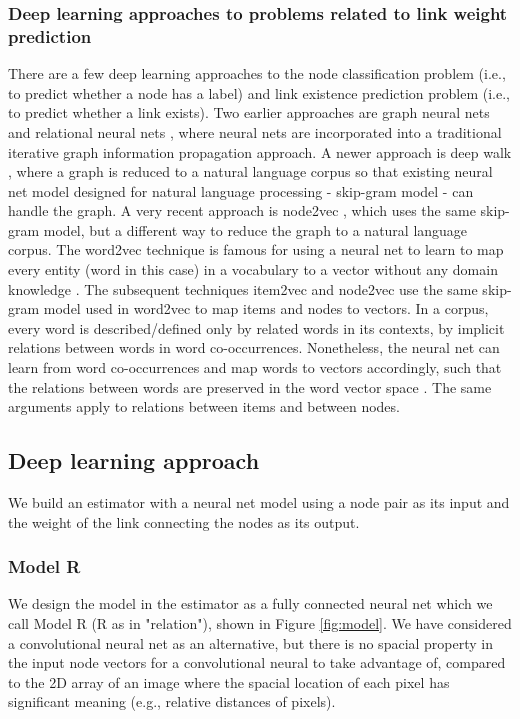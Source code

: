 \documentclass{article}
\begin{document}
\subsubsection{Deep learning approaches to problems related to link weight prediction}
There are a few deep learning approaches to
the node classification problem (i.e., to predict whether a node has a label) and 
link existence prediction problem (i.e., to predict whether a link exists).
Two earlier approaches are graph neural nets and relational neural 
nets \cite{scarselli2009graph},
where neural nets are incorporated into a traditional iterative graph 
information propagation approach.
A newer approach is deep walk \cite{perozzi2014deepwalk}, 
where a graph is reduced to a natural language corpus so that existing neural 
net model designed for natural language processing - skip-gram model - can handle the graph.
A very recent approach is node2vec \cite{grovernode2vec},
which uses the same skip-gram model, 
but a different way to reduce the graph to a natural language corpus.
The word2vec technique is famous for using a neural net to learn to map every 
entity (word in this case) in a vocabulary to a vector without any domain 
knowledge \cite{mikolov2013efficient}.
The subsequent techniques item2vec \cite{barkan2016item2vec}
and node2vec \cite{grovernode2vec} use the same skip-gram 
model used in word2vec to map items and nodes to vectors.
In a corpus, every word is described/defined only by related words in its 
contexts, by implicit relations between words in word co-occurrences.
Nonetheless, the neural net can learn from word co-occurrences and map words to 
vectors accordingly,
such that the relations between words are preserved in the word vector space 
\cite{mikolov2013distributed}.
The same arguments apply to relations between items and between nodes.

\subsection{Deep learning approach}
We build an estimator with a neural net model using a node pair as its input
and the weight of the link connecting the nodes as its output.

\subsubsection{Model R}
We design the model in the estimator as a fully connected neural net which we call Model R (R as in "relation"), shown in Figure \ref{fig:model}.
We have considered a convolutional neural net as an alternative,
but there is no spacial property in the input node vectors
for a convolutional neural to take advantage of,
compared to the 2D array of an image where the spacial location of each pixel
has significant meaning (e.g., relative distances of pixels).
\end{document}

